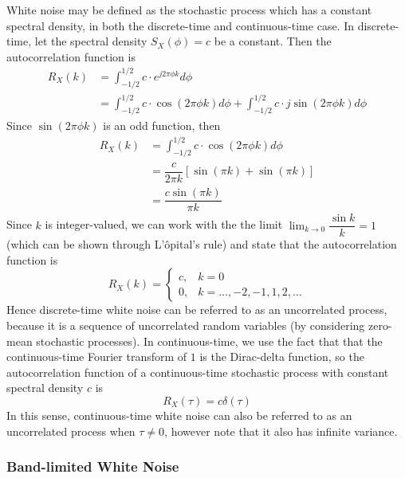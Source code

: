 \documentclass[11pt]{report} %
\begin{document}
White noise may be defined as the stochastic process which has a constant spectral density, in both the discrete-time and continuous-time case. In discrete-time, let the spectral density $S_{X}\left(\phi\right) = c$ be a constant. Then the autocorrelation function is
\begin{align}
R_{X}\left(k\right) &= \int_{-1/2}^{1/2}c\cdot e^{j2\pi\phi k} d\phi \\
&= \int_{-1/2}^{1/2}c\cdot \cos\left(2\pi\phi k\right) d\phi + \int_{-1/2}^{1/2}c\cdot j\sin\left(2\pi\phi k\right) d\phi
\end{align}
Since $\sin\left(2\pi\phi k\right)$ is an odd function, then
\begin{align}
R_{X}\left(k\right) &=\int_{-1/2}^{1/2}c\cdot \cos\left(2\pi\phi k\right) d\phi \\
&= \dfrac{c}{2\pi k}\left[\sin\left(\pi k\right) + \sin\left(\pi k\right)\right] \\
&= \dfrac{c\sin\left(\pi k\right)}{\pi k}
\end{align}
Since $k$ is integer-valued, we can work with the the limit $\lim_{k \to 0}\dfrac{\sin k}{k} = 1$ (which can be shown through L'\^{o}pital's rule) and state that the autocorrelation function is
\begin{equation}
R_{X}\left(k\right) = \begin{cases} c, & k = 0 \\ 0, & k = \dots, -2, -1, 1, 2, \dots \end{cases}
\end{equation}
Hence discrete-time white noise can be referred to as an uncorrelated process, because it is a sequence of uncorrelated random variables (by considering zero-mean stochastic processes). In continuous-time, we use the fact that that the continuous-time Fourier transform of $1$ is the Dirac-delta function, so the autocorrelation function of a continuous-time stochastic process with constant spectral density $c$ is
\begin{equation}
R_{X}\left(\tau\right) = c\delta\left(\tau\right)
\end{equation}
In this sense, continuous-time white noise can also be referred to as an uncorrelated process when $\tau \neq 0$, however note that it also has infinite variance.

\subsubsection{Band-limited White Noise}
\end{document}
